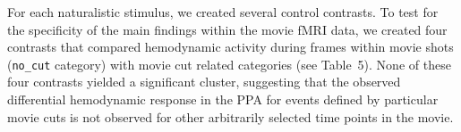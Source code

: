 \documentclass[english,11pt]{article}
\begin{document}

For each naturalistic stimulus, we created several control contrasts.
To test for the specificity of the main findings within the movie fMRI data, we
created four contrasts that compared hemodynamic activity during frames within
movie shots (\texttt{no\_cut} category) with movie cut related categories (see
Table~5).
None of these four contrasts yielded a significant cluster, suggesting that the
observed differential hemodynamic response in the PPA for events defined by
particular movie cuts is not observed for other arbitrarily selected time points
in the movie.
\end{document}
